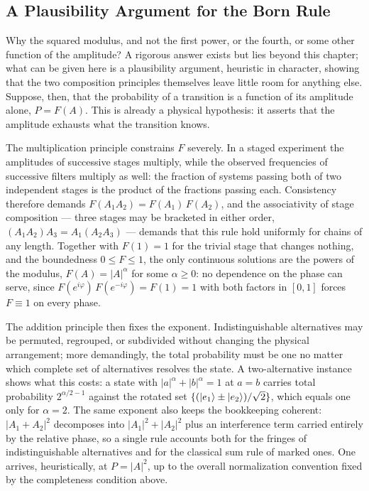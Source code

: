 \subsection*{A Plausibility Argument for the Born Rule}

Why the squared modulus, and not the first power, or the fourth, or some other function of the amplitude? A rigorous answer exists but lies beyond this chapter; what can be given here is a plausibility argument, heuristic in character, showing that the two composition principles themselves leave little room for anything else. Suppose, then, that the probability of a transition is a function of its amplitude alone, $P = F(A)$. This is already a physical hypothesis: it asserts that the amplitude exhausts what the transition knows.

The multiplication principle constrains $F$ severely. In a staged experiment the amplitudes of successive stages multiply, while the observed frequencies of successive filters multiply as well: the fraction of systems passing both of two independent stages is the product of the fractions passing each. Consistency therefore demands $F(A_1 A_2) = F(A_1)\,F(A_2)$, and the associativity of stage composition --- three stages may be bracketed in either order, $(A_1 A_2) A_3 = A_1 (A_2 A_3)$ --- demands that this rule hold uniformly for chains of any length. Together with $F(1) = 1$ for the trivial stage that changes nothing, and the boundedness $0 \leq F \leq 1$, the only continuous solutions are the powers of the modulus, $F(A) = |A|^\alpha$ for some $\alpha \geq 0$: no dependence on the phase can serve, since $F(e^{i\varphi})\,F(e^{-i\varphi})=F(1)=1$ with both factors in $[0,1]$ forces $F\equiv1$ on every phase.

The addition principle then fixes the exponent. Indistinguishable alternatives may be permuted, regrouped, or subdivided without changing the physical arrangement; more demandingly, the total probability must be one no matter which complete set of alternatives resolves the state. A two-alternative instance shows what this costs: a state with $|a|^\alpha+|b|^\alpha=1$ at $a=b$ carries total probability $2^{\alpha/2-1}$ against the rotated set $\{(\ket{e_1}\pm\ket{e_2})/\sqrt{2}\}$, which equals one only for $\alpha=2$. The same exponent also keeps the bookkeeping coherent: $|A_1 + A_2|^2$ decomposes into $|A_1|^2 + |A_2|^2$ plus an interference term carried entirely by the relative phase, so a single rule accounts both for the fringes of indistinguishable alternatives and for the classical sum rule of marked ones. One arrives, heuristically, at $P = |A|^2$, up to the overall normalization convention fixed by the completeness condition above.

